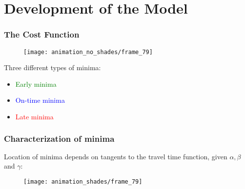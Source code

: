 \documentclass[hyperref={pdfpagelabels=false}]{beamer}
\begin{document}
\section{Development of the Model}

\begin{frame}
  \tableofcontents[currentsection]
\end{frame}

\begin{frame}
  \frametitle{The Cost Function}
  \begin{figure}
    \centering
    \texttt{[image: animation\_no\_shades/frame\_79]}
  \end{figure}
  Three different types of minima:
  \begin{itemize}
  \item \textcolor{green}{Early minima}
  \item \textcolor{blue}{On-time minima}
  \item \textcolor{red}{Late minima}
  \end{itemize}
\end{frame}

\begin{frame}
  \frametitle{Characterization of minima}
  Location of minima depends on tangents to the travel time function, given \(\alpha, \beta\) and \(\gamma\):
  \begin{figure}
    \centering
    \texttt{[image: animation\_shades/frame\_79]}
  \end{figure}
\end{frame}
\end{document}
